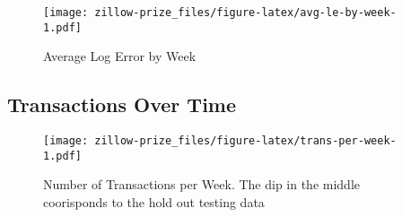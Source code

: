 \documentclass[]{book}
\newenvironment{Shaded}{\begin{snugshade}}{\end{snugshade}}
\newcommand{\KeywordTok}[1]{\textcolor[rgb]{0.13,0.29,0.53}{\textbf{#1}}}
\newcommand{\DataTypeTok}[1]{\textcolor[rgb]{0.13,0.29,0.53}{#1}}
\newcommand{\DecValTok}[1]{\textcolor[rgb]{0.00,0.00,0.81}{#1}}
\newcommand{\FloatTok}[1]{\textcolor[rgb]{0.00,0.00,0.81}{#1}}
\newcommand{\StringTok}[1]{\textcolor[rgb]{0.31,0.60,0.02}{#1}}
\newcommand{\OperatorTok}[1]{\textcolor[rgb]{0.81,0.36,0.00}{\textbf{#1}}}
\newcommand{\NormalTok}[1]{#1}
\theoremstyle{definition}
\theoremstyle{definition}
\theoremstyle{definition}
\theoremstyle{remark}
\begin{document}
\begin{figure}
\centering
\texttt{[image: zillow-prize\_files/figure-latex/avg-le-by-week-1.pdf]}
\caption{\label{fig:avg-le-by-week}Average Log Error by Week}
\end{figure}

\subsection{Transactions Over Time}\label{transactions-over-time}

\begin{Shaded}
\end{Shaded}

\begin{figure}
\centering
\texttt{[image: zillow-prize\_files/figure-latex/trans-per-week-1.pdf]}
\caption{\label{fig:trans-per-week}Number of Transactions per Week. The dip
in the middle coorisponds to the hold out testing data}
\end{figure}

\begin{Shaded}
\end{Shaded}
\end{document}
